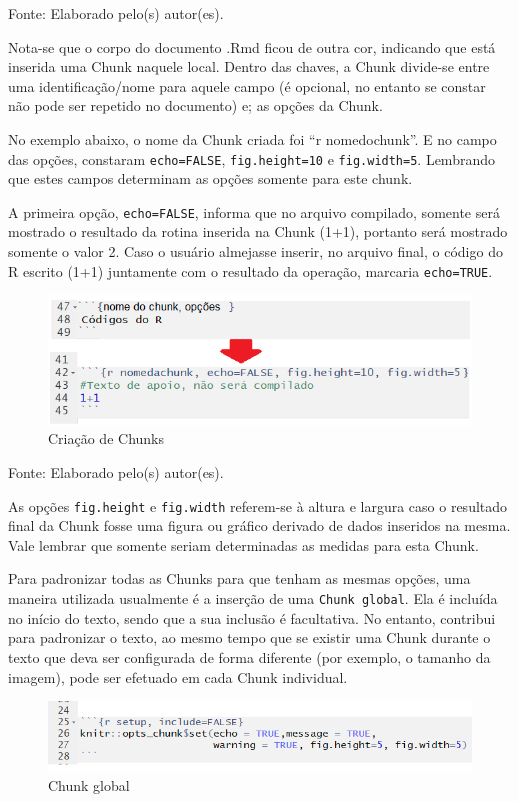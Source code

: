 \documentclass[12pt,brazil,oneside]{book}
\begin{document}
Fonte: Elaborado pelo(s) autor(es).

Nota-se que o corpo do documento .Rmd ficou de outra cor, indicando que
está inserida uma Chunk naquele local. Dentro das chaves, a Chunk
divide-se entre uma identificação/nome para aquele campo (é opcional, no
entanto se constar não pode ser repetido no documento) e; as opções da
Chunk.

No exemplo abaixo, o nome da Chunk criada foi ``r nomedochunk''. E no
campo das opções, constaram \texttt{echo=FALSE}, \texttt{fig.height=10}
e \texttt{fig.width=5}. Lembrando que estes campos determinam as opções
somente para este chunk.

A primeira opção, \texttt{echo=FALSE}, informa que no arquivo compilado,
somente será mostrado o resultado da rotina inserida na Chunk (1+1),
portanto será mostrado somente o valor 2. Caso o usuário almejasse
inserir, no arquivo final, o código do R escrito (1+1) juntamente com o
resultado da operação, marcaria \texttt{echo=TRUE}.

\begin{figure}[H]

{\centering \includegraphics[width=0.6\linewidth]{rmarkchunk2} 

}

\caption{Criação de Chunks}\label{fig:rmarkchunk2}
\end{figure}

Fonte: Elaborado pelo(s) autor(es).

As opções \texttt{fig.height} e \texttt{fig.width} referem-se à altura e
largura caso o resultado final da Chunk fosse uma figura ou gráfico
derivado de dados inseridos na mesma. Vale lembrar que somente seriam
determinadas as medidas para esta Chunk.

Para padronizar todas as Chunks para que tenham as mesmas opções, uma
maneira utilizada usualmente é a inserção de uma \texttt{Chunk\ global}.
Ela é incluída no início do texto, sendo que a sua inclusão é
facultativa. No entanto, contribui para padronizar o texto, ao mesmo
tempo que se existir uma Chunk durante o texto que deva ser configurada
de forma diferente (por exemplo, o tamanho da imagem), pode ser efetuado
em cada Chunk individual.

\begin{figure}[H]

{\centering \includegraphics[width=0.6\linewidth]{rmarkchunkopt} 

}

\caption{Chunk global}\label{fig:rmarkchunkopt}
\end{figure}
\end{document}
